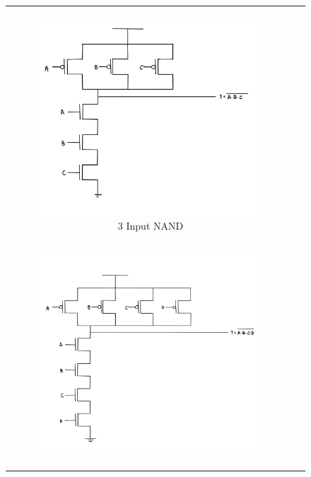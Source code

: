 \documentclass[conference]{IEEEtran}
\begin{document}
\begin{figure}[H]
\begin{tabular}{cc}
\begin{subfigure}{0.44\linewidth}
            \includegraphics[width=\textwidth]{images/nand_3_cmos_circuit_diagram.png}
            \caption{3 Input NAND}
        \end{subfigure} \\
        \begin{subfigure}{0.44\linewidth}
            \centering
            \includegraphics[width=\textwidth]{images/nand_4_cmos_circuit_diagram.png}

\end{subfigure}
\end{tabular}
\end{figure}
\end{document}
